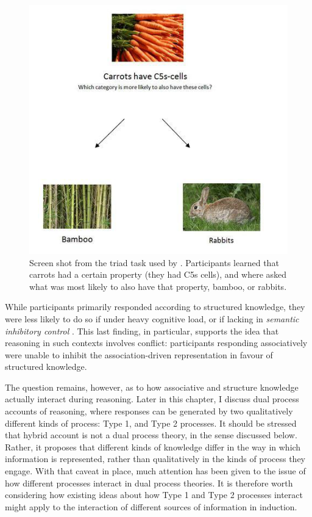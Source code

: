 \begin{figure}[ht]
  \centering
  \includegraphics[width=\figurewidth]{imgs/crisp_screenshot.png}
  \caption[
    Screen shot from the triad task used by \citet{Bright}.]{
    \label{fig:crisp_screenshot1}
    Screen shot from the triad task used by \citet{Bright}.
    Participants learned that carrots had a certain property (they had C5s cells),
    and where asked what was most likely to also have that property,
    bamboo, or rabbits.
  }
\end{figure}

While  participants
primarily responded according to structured knowledge,
they were less likely to do so if under heavy cognitive load,
or if lacking in \emph{semantic inhibitory control} \citep{Burgess1997,Markovits2004}.
This last finding, in particular, supports the idea
that reasoning in such contexts involves conflict:
participants responding associatively
were unable to inhibit the
association-driven representation in favour of structured knowledge.

The question remains, however, as to how associative and structure knowledge
actually interact during reasoning.
Later in this chapter, I discuss dual process accounts of reasoning,
where responses can be generated by
two qualitatively different kinds of process:
Type 1, and Type 2 processes.
It should be stressed that  hybrid account
is not a dual process theory, in the sense discussed below.
Rather, it proposes that different kinds of knowledge
differ in the way in which information is represented,
rather than qualitatively in the kinds of process they engage.
With that caveat in place,
much attention \citep[e.g.][]{Evans2007a} has been given to
the issue of how different processes interact in dual process theories.
It is therefore worth considering
how existing ideas about how Type 1 and Type 2 processes interact
might apply to the interaction of different sources of information in induction.

